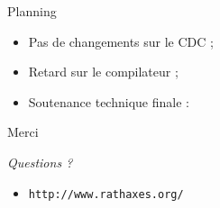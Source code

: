 \documentclass{beamer}
\begin{document}
\begin{frame}{Planning}
\Large{
\begin{itemize}
\item Pas de changements sur le CDC ;
\item Retard sur le compilateur ;
\item Soutenance technique finale :
\end{itemize}
}
\end{frame}

\begin{frame}{Merci}
\begin{center}
\Huge{\emph{Questions ?}}
\end{center}

\vspace{2em}
\begin{itemize}
\item \Large{\texttt{http://www.rathaxes.org/}}
\end{itemize}
\end{frame}
\end{document}
